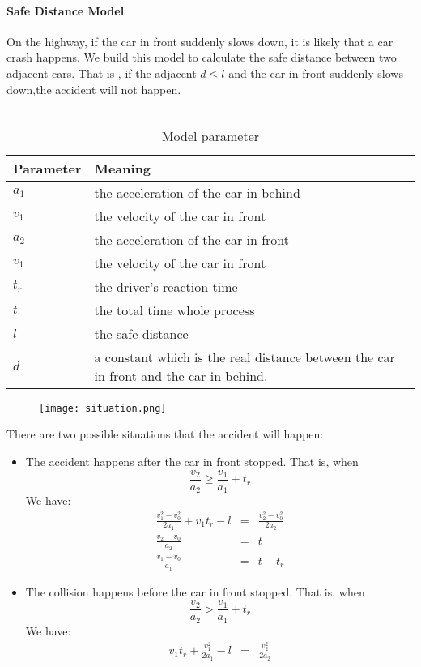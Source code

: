 \paragraph{Safe Distance Model}

On the highway, if the car in front suddenly slows down, it is likely that a car crash happens.
We build this model to calculate the safe distance between two adjacent cars. That is ,
if the adjacent $d \leq l$ and the car in front suddenly slows down,the accident will not happen.\\ \\
\begin{table}
\centering
\begin{tabular}{ll}
\hline
Parameter & Meaning\\
\hline
$a_1$ & the acceleration of the  car in behind \\
$v_1$ & the velocity of the  car in front \\
$a_2$ & the acceleration of the car in front \\
$v_1$ & the velocity of the  car in front \\
$t_r$ & the driver's reaction time \\
$t$ & the total time whole process \\
$l$ & the safe distance \\
$d$ & a constant which is the real distance between the car in front and the car in behind.\\
\hline
\end{tabular}
\caption{Model parameter}
\end{table}

\begin{figure}[h]
\small
\centering
\texttt{[image: situation.png]}
\caption{} %
\end{figure}

There are two possible situations that the accident will happen:
\begin{itemize}
\item The accident happens after the car in front stopped.
That is, when
\begin{displaymath}
\frac{v_2}{a_2}  \geq  \frac{v_1}{a_1} + t_r
\end{displaymath}
We have:
\begin{eqnarray}
\frac{v_1^2 - v_0 ^ 2}{2a_1} + v_1 t_r - l & = & \frac{v_2 ^ 2 - v_0 ^ 2}{2a_2}\\
\frac{v_2 - v_0}{a_2} & = & t\\
\frac{v_1 - v_0}{a_1} & = & t - t_r
\end{eqnarray}
\item The collision happens before the car in front stopped. That is, when
\begin{displaymath}
\frac{v_2}{a_2}  >  \frac{v_1}{a_1} + t_r
\end{displaymath}
We have:
\begin{eqnarray}
v_1 t_r + \frac{v_1 ^ 2}{2a_1} - l& = &\frac{v_2^2}{2a_2}
\end{eqnarray}
\end{itemize}

